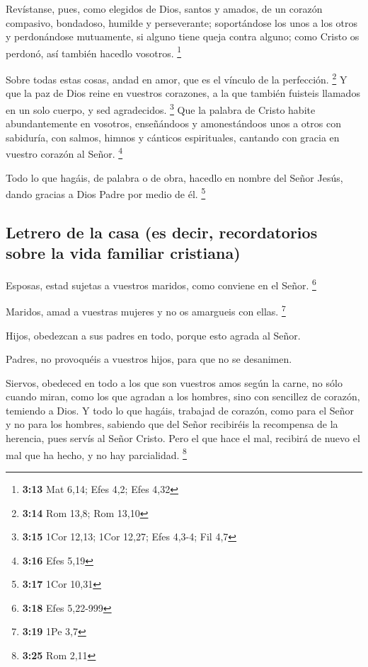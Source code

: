 \begin{paracol}{2}
 Revístanse, pues, como elegidos de Dios, santos y
amados, de un corazón compasivo, bondadoso, humilde y perseverante;
 soportándose los unos a los otros y perdonándose
mutuamente, si alguno tiene queja contra alguno; como Cristo os perdonó,
así también hacedlo vosotros. \footnote{\textbf{3:13} Mat 6,14; Efes
  4,2; Efes 4,32}

 Sobre todas estas cosas, andad en amor, que es el
vínculo de la perfección. \footnote{\textbf{3:14} Rom 13,8; Rom 13,10}
 Y que la paz de Dios reine en vuestros corazones, a la
que también fuisteis llamados en un solo cuerpo, y sed agradecidos.
\footnote{\textbf{3:15} 1Cor 12,13; 1Cor 12,27; Efes 4,3-4; Fil 4,7}
 Que la palabra de Cristo habite abundantemente en
vosotros, enseñándoos y amonestándoos unos a otros con sabiduría, con
salmos, himnos y cánticos espirituales, cantando con gracia en vuestro
corazón al Señor. \footnote{\textbf{3:16} Efes 5,19}

 Todo lo que hagáis, de palabra o de obra, hacedlo en
nombre del Señor Jesús, dando gracias a Dios Padre por medio de él.
\footnote{\textbf{3:17} 1Cor 10,31}

\hypertarget{letrero-de-la-casa-es-decir-recordatorios-sobre-la-vida-familiar-cristiana}{%
\subsection{Letrero de la casa (es decir, recordatorios sobre la vida
familiar
cristiana)}\label{letrero-de-la-casa-es-decir-recordatorios-sobre-la-vida-familiar-cristiana}}

 Esposas, estad sujetas a vuestros maridos, como conviene
en el Señor. \footnote{\textbf{3:18} Efes 5,22-999}

 Maridos, amad a vuestras mujeres y no os amargueis con
ellas. \footnote{\textbf{3:19} 1Pe 3,7}

 Hijos, obedezcan a sus padres en todo, porque esto
agrada al Señor.

 Padres, no provoquéis a vuestros hijos, para que no se
desanimen.

 Siervos, obedeced en todo a los que son vuestros amos
según la carne, no sólo cuando miran, como los que agradan a los
hombres, sino con sencillez de corazón, temiendo a Dios. 
Y todo lo que hagáis, trabajad de corazón, como para el Señor y no para
los hombres,  sabiendo que del Señor recibiréis la
recompensa de la herencia, pues servís al Señor Cristo. 
Pero el que hace el mal, recibirá de nuevo el mal que ha hecho, y no hay
parcialidad. \footnote{\textbf{3:25} Rom 2,11}


\end{paracol}
